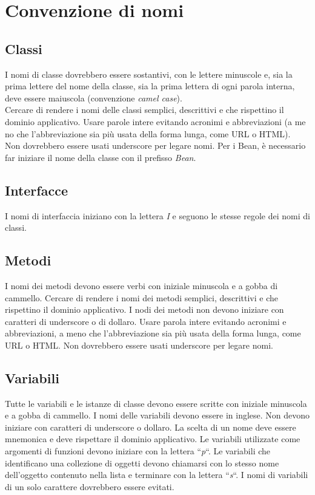 \section{Convenzione di nomi}
\subsection{Classi}
I nomi di classe dovrebbero essere sostantivi, con le lettere minuscole e, sia la prima lettere del nome della classe, sia la prima lettera di ogni parola interna, deve essere maiuscola (convenzione \textit{camel case}).\\
Cercare di rendere i nomi delle classi semplici, descrittivi e che rispettino il dominio applicativo. Usare parole intere evitando acronimi e abbreviazioni (a me no che l'abbreviazione sia più usata della forma lunga, come URL o HTML).\\
Non dovrebbero essere usati underscore per legare nomi. Per i Bean, è necessario far iniziare il nome della classe con il prefisso \textit{Bean}.
\subsection{Interfacce}
I nomi di interfaccia iniziano con la lettera \textit{I} e seguono le stesse regole dei nomi di classi.
\subsection{Metodi}
I nomi dei metodi devono essere verbi con iniziale minuscola e a gobba di cammello. Cercare di rendere i nomi dei metodi semplici, descrittivi e che rispettino il dominio applicativo. I nodi dei metodi non devono iniziare con caratteri di underscore o di dollaro. Usare parola intere evitando acronimi e abbreviazioni, a meno che l'abbreviazione sia più usata della forma lunga, come URL o HTML. Non dovrebbero essere usati underscore per legare nomi.
\subsection{Variabili}
Tutte le variabili e le istanze di classe devono essere scritte con iniziale minuscola e a gobba di cammello. I nomi delle variabili devono essere in inglese. Non devono iniziare con caratteri di underscore o dollaro. La scelta di un nome deve essere mnemonica e deve rispettare il dominio applicativo. Le variabili utilizzate come argomenti di funzioni devono iniziare con la lettera ``\textit{p}``. Le variabili che identificano una collezione di oggetti devono chiamarsi con lo stesso nome dell'oggetto contenuto nella lista e terminare con la lettera ``\textit{s}``. I nomi di variabili di un solo carattere dovrebbero essere evitati.

